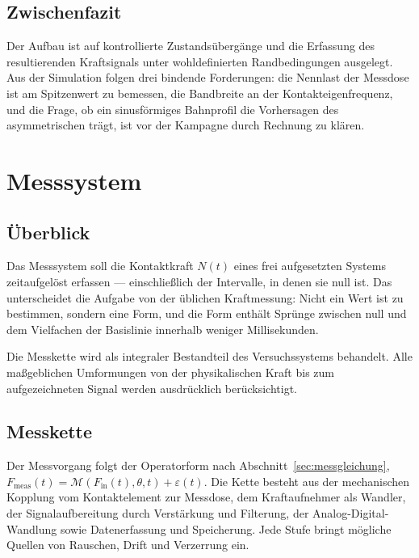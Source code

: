 \documentclass[12pt,a4paper]{report}
\begin{document}
\section{Zwischenfazit}

Der Aufbau ist auf kontrollierte Zustandsübergänge und die Erfassung des
resultierenden Kraftsignals unter wohldefinierten Randbedingungen
ausgelegt. Aus der Simulation folgen drei bindende Forderungen: die
Nennlast der Messdose ist am Spitzenwert zu bemessen, die Bandbreite an
der Kontakteigenfrequenz, und die Frage, ob ein sinusförmiges Bahnprofil
die Vorhersagen des asymmetrischen trägt, ist vor der Kampagne durch
Rechnung zu klären.


\chapter{Messsystem}
\label{chap:messsystem}

\section{Überblick}

Das Messsystem soll die Kontaktkraft $N(t)$ eines frei aufgesetzten
Systems zeitaufgelöst erfassen --- einschließlich der Intervalle, in
denen sie null ist. Das unterscheidet die Aufgabe von der üblichen
Kraftmessung: Nicht ein Wert ist zu bestimmen, sondern eine Form, und
die Form enthält Sprünge zwischen null und dem Vielfachen der
Basislinie innerhalb weniger Millisekunden.

Die Messkette wird als integraler Bestandteil des Versuchssystems
behandelt. Alle maßgeblichen Umformungen von der physikalischen Kraft
bis zum aufgezeichneten Signal werden ausdrücklich berücksichtigt.

\section{Messkette}

Der Messvorgang folgt der Operatorform nach
Abschnitt~\ref{sec:messgleichung},
$F_{\mathrm{meas}}(t) = \mathcal{M}(F_{\mathrm{in}}(t), \theta, t) + \varepsilon(t)$.
Die Kette besteht aus der mechanischen Kopplung vom Kontaktelement zur
Messdose, dem Kraftaufnehmer als Wandler, der Signalaufbereitung durch
Verstärkung und Filterung, der Analog-Digital-Wandlung sowie
Datenerfassung und Speicherung. Jede Stufe bringt mögliche Quellen von
Rauschen, Drift und Verzerrung ein.
\end{document}

